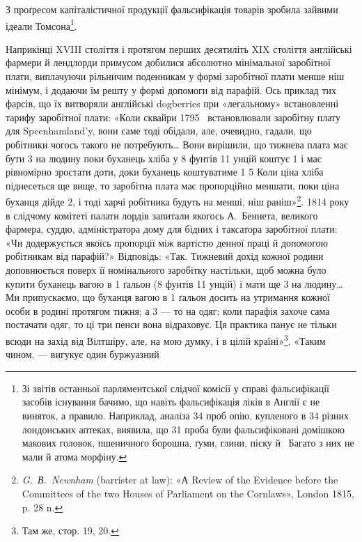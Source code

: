 З проґресом капіталістичної продукції фальсифікація
товарів зробила зайвими ідеали Томсона\footnote{
Зі звітів останньої парляментської слідчої комісії у справі фальсифікації
засобів існування бачимо, що навіть фальсифікація ліків в
Англії є не виняток, а правило. Наприклад, аналіза 34 проб опію, купленого
в 34 різних лондонських аптеках, виявила, що 31 проба були фальсифіковані
домішкою макових головок, пшеничного борошна, ґуми,
глини, піску й~ Багато з них не мали й атома морфіну.
}.

Наприкінці XVIII століття і протягом перших десятиліть
XIX століття англійські фармери й лендлорди примусом добилися
абсолютно мінімальної заробітної плати, виплачуючи рільничим
поденникам у формі заробітної плати менше ніш мінімум,
і додаючи їм решту у формі допомоги від парафій. Ось приклад
тих фарсів, що їх витворяли англійські dogberries при «легальному»
встановленні тарифу заробітної плати: «Коли сквайри
1795~ встановлювали заробітну плату для Speenhamland’y,
вони саме тоді обідали, але, очевидно, гадали, що робітники
чогось такого не потребують\dots{} Вони вирішили, що тижнева
плата має бути 3 на людину поки буханець хліба
у 8 фунтів 11 унцій коштує 1 і має рівномірно зростати
доти, доки буханець коштуватиме 1 5
Коли ціна хліба піднесеться ще вище, то заробітна плата
має пропорційно меншати, поки ціна буханця дійде 2,
і тоді харчі робітника будуть на  менші, ніш раніш»\footnote{
\emph{G.~В.~Newnham} (barrister at law): «А Review of the Evidence
before the Committees of the two Houses of Parliament on the Cornlaws»,
London 1815, p. 28 n.
}.
1814 року в слідчому комітеті палати лордів запитали якогось
А.~Беннета, великого фармера, суддю, адміністратора дому для
бідних і таксатора заробітної плати: «Чи додержується якоїсь
пропорції між вартістю денної праці й допомогою робітникам
від парафій?» Відповідь: «Так. Тижневий дохід кожної родини
доповнюється поверх її номінального заробітку настільки, щоб
можна було купити буханець вагою в 1 ґальон (8 фунтів 11 унцій)
і мати ще 3 на людину\dots{} Ми припускаємо, що буханця
вагою в 1 ґальон досить на утримання кожної особи в родині
протягом тижня; а 3 — то на одяг; коли парафія захоче
сама постачати одяг, то ці три пенси вона відраховує. Ця практика
панує не тільки всюди на захід від Вілтшіру, але, на мою
думку, і в цілій країні»\footnote{
Там же, стор. 19, 20.
}. «Таким чином, — вигукує один буржуазний
